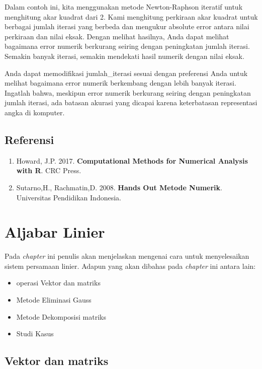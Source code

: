 \documentclass[
]{book}
\providecommand{\tightlist}{%
  \setlength{\itemsep}{0pt}\setlength{\parskip}{0pt}}
\theoremstyle{definition}
\theoremstyle{definition}
\theoremstyle{definition}
\theoremstyle{definition}
\theoremstyle{remark}
\begin{document}
Dalam contoh ini, kita menggunakan metode Newton-Raphson iteratif untuk menghitung akar kuadrat dari 2. Kami menghitung perkiraan akar kuadrat untuk berbagai jumlah iterasi yang berbeda dan mengukur absolute error antara nilai perkiraan dan nilai eksak. Dengan melihat hasilnya, Anda dapat melihat bagaimana error numerik berkurang seiring dengan peningkatan jumlah iterasi. Semakin banyak iterasi, semakin mendekati hasil numerik dengan nilai eksak.

Anda dapat memodifikasi jumlah\_iterasi sesuai dengan preferensi Anda untuk melihat bagaimana error numerik berkembang dengan lebih banyak iterasi. Ingatlah bahwa, meskipun error numerik berkurang seiring dengan peningkatan jumlah iterasi, ada batasan akurasi yang dicapai karena keterbatasan representasi angka di komputer.

\hypertarget{referensi}{%
\section{Referensi}\label{referensi}}

\begin{enumerate}
\def\labelenumi{\arabic{enumi}.}
\tightlist
\item
  Howard, J.P. 2017. \textbf{Computational Methods for Numerical Analysis with R}. CRC Press.
\item
  Sutarno,H., Rachmatin,D. 2008. \textbf{Hands Out Metode Numerik}. Universitas Pendidikan Indonesia.
\end{enumerate}

\hypertarget{linearaljabar}{%
\chapter{Aljabar Linier}\label{linearaljabar}}

Pada \emph{chapter} ini penulis akan menjelaskan mengenai cara untuk menyelesaikan sistem persamaan linier. Adapun yang akan dibahas pada \emph{chapter} ini antara lain:

\begin{itemize}
\tightlist
\item
  operasi Vektor dan matriks
\item
  Metode Eliminasi Gauss
\item
  Metode Dekomposisi matriks
\item
  Studi Kasus
\end{itemize}

\hypertarget{vecmat}{%
\section{Vektor dan matriks}\label{vecmat}}
\end{document}
